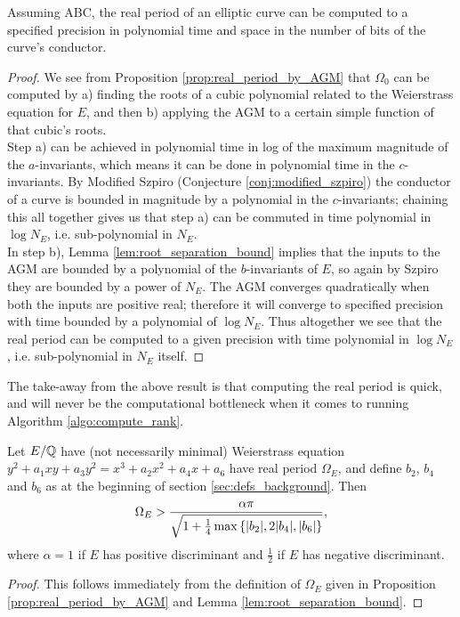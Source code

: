 \begin{corollary}\label{cor:real_period_time_complexity}
Assuming ABC, the real period of an elliptic curve can be computed to a specified precision in polynomial time and space in the number of bits of the curve's conductor.
\end{corollary}
\begin{proof}
We see from Proposition \ref{prop:real_period_by_AGM} that $\Omega_0$ can be computed by a) finding the roots of a cubic polynomial related to the Weierstrass equation for $E$, and then b) applying the AGM to a certain simple function of that cubic's roots. \\

Step a) can be achieved in polynomial time in log of the maximum magnitude of the $a$-invariants, which means it can be done in polynomial time in the $c$-invariants. By Modified Szpiro (Conjecture \ref{conj:modified_szpiro}) the conductor of a curve is bounded in magnitude by a polynomial in the $c$-invariants; chaining this all together gives us that step a) can be commuted in time polynomial in $\log N_E$, i.e. sub-polynomial in $N_E$. \\

In step b), Lemma \ref{lem:root_separation_bound} implies that the inputs to the AGM are bounded by a polynomial of the $b$-invariants of $E$, so again by Szpiro they are bounded by a power of $N_E$. The AGM converges quadratically when both the inputs are positive real; therefore it will converge to specified precision with time bounded by a polynomial of $\log N_E$. Thus altogether we see that the real period can be computed to a given precision with time polynomial in $\log N_E$, i.e. sub-polynomial in $N_E$ itself.
\end{proof}

The take-away from the above result is that computing the real period is quick, and will never be the computational bottleneck when it comes to running Algorithm \ref{algo:compute_rank}. \\

\begin{corollary}[S.]\label{ineq:Omega_bn_bound}
Let $E/\mathbb{Q}$ have (not necessarily minimal) Weierstrass equation \\
$y^2 + a_1 xy + a_3 y^2 = x^3 + a_2 x^2 + a_4 x + a_6$ have real period $\Omega_E$, and define $b_2$, $b_4$ and $b_6$ as at the beginning of section \ref{sec:defs_background}. Then
\begin{equation}
\Omega_E > \frac{\alpha \pi}{\sqrt{1+\frac{1}{4}\max\left\{|b_2|,2|b_4|,|b_6|\right\}}},
\end{equation}
where $\alpha = 1$ if $E$ has positive discriminant and $\frac{1}{2}$ if $E$ has negative discriminant.
\end{corollary}
\begin{proof}
This follows immediately from the definition of $\Omega_E$ given in Proposition \ref{prop:real_period_by_AGM} and Lemma \ref{lem:root_separation_bound}.
\end{proof}

